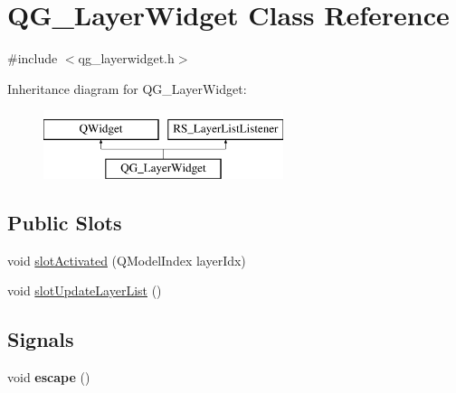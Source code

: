 \hypertarget{classQG__LayerWidget}{\section{Q\-G\-\_\-\-Layer\-Widget Class Reference}
\label{classQG__LayerWidget}
}


{\ttfamily \#include $<$qg\-\_\-layerwidget.\-h$>$}

Inheritance diagram for Q\-G\-\_\-\-Layer\-Widget\-:\begin{figure}[H]
\begin{center}
\leavevmode
\includegraphics[height=2.000000cm]{classQG__LayerWidget}
\end{center}
\end{figure}
\subsection*{Public Slots}
\begin{DoxyCompactItemize}
\item 
void \hyperlink{classQG__LayerWidget_af03d6b4cc7f89d32825f106c0531ab2a}{slot\-Activated} (Q\-Model\-Index layer\-Idx)
\item 
void \hyperlink{classQG__LayerWidget_a00a5de91ad496b13ab0f626ce0058a0b}{slot\-Update\-Layer\-List} ()
\end{DoxyCompactItemize}
\subsection*{Signals}
\begin{DoxyCompactItemize}
\item 
\hypertarget{classQG__LayerWidget_a986aa49a56aa7c8f0156164519abc69e}{void {\bfseries escape} ()}\label{classQG__LayerWidget_a986aa49a56aa7c8f0156164519abc69e}

\end{DoxyCompactItemize}
